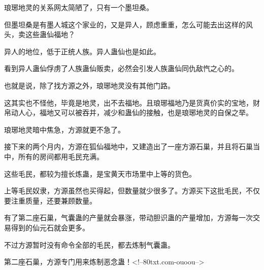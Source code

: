 \begin{this_body}
琅琊地灵的关系网太简陋了，只有一个墨坦桑。

但墨坦桑是有墨人城这个家业的，又是异人，顾虑重重，怎么可能去出这样的风头，卖这些蛊仙福地？

异人的地位，低于正统人族。异人蛊仙也是如此。

看到异人蛊仙俘虏了人族蛊仙贩卖，必然会引发人族蛊仙同仇敌忾之心的。

也就是说，除了找方源之外，琅琊地灵没有其他门路。

这其实也不怪他，毕竟是地灵，出不去福地。且琅琊福地乃是货真价实的宝地，财帛动人心，福地又可以被吞并，减少和蛊仙的接触，也是琅琊地灵的自保之举。

琅琊地灵暗中焦急，方源就更不急了。

接下来的两个月内，方源在狐仙福地中，又建造出了一座方源石巢，并且将石巢当中，所有的房间都用毛民充满。

这些毛民，都较为擅长炼蛊，是宝黄天市场里中上等的货色。

上等毛民奴隶，方源虽然也买得起，但数量就少很多了。方源买下这批毛民，不仅要注重质量，还要兼顾数量。

有了第二座石巢，气囊蛊的产量就会暴涨，带动胆识蛊的产量增加，方源每一次交易得到的仙元石就会更多。

不过方源暂时没有命令全部的毛民，都去炼制气囊蛊。

第二座石巢，方源专门用来炼制恶念蛊！<!--80txt.com-ouoou-->

\end{this_body}

